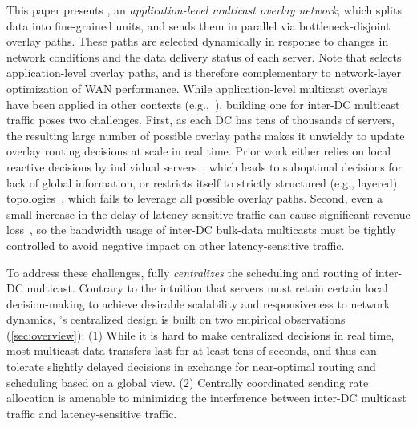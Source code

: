 This paper presents {\em \name}, an {\em application-level multicast
overlay network}, which splits data into fine-grained units, and
sends them in parallel via bottleneck-disjoint overlay paths. These
paths are selected dynamically in response to changes in network
conditions and the data delivery status of each server. Note that
\name selects application-level overlay paths, and is therefore
complementary to network-layer optimization of WAN performance.
While application-level multicast overlays have been applied in other
contexts (e.g.,~\cite{Liebeherr2002Application,Wang2007mTreebone,
Andreev2013Designing,Mokhtarian2015Minimum}), building one for
inter-DC multicast traffic poses two challenges. First, as each DC
has tens of thousands of servers, the resulting large number of
possible overlay paths makes it unwieldy to update overlay routing
decisions at scale in real time. Prior work either relies on local
reactive decisions by individual servers~\cite{kostic2003bullet,
Repantis2010Scaling,Huang2014A}, which leads to suboptimal decisions
for lack of global information, or restricts itself to strictly
structured (e.g., layered) topologies~\cite{Nygren2010The}, which
fails to leverage all possible overlay paths. Second, even a small
increase in the delay of latency-sensitive traffic can cause
significant revenue loss~\cite{zhang2017communication}, so the bandwidth usage of inter-DC
bulk-data multicasts must be tightly controlled to avoid negative
impact on other latency-sensitive traffic.

To address these challenges, \name fully {\em centralizes} the
scheduling and routing of inter-DC multicast. Contrary to the
intuition that servers must retain certain local decision-making to
achieve desirable scalability and responsiveness to network dynamics,
\name's centralized design is built on two empirical observations
(\Section\ref{sec:overview}):
(1) While it is hard to make centralized decisions in real time, most
multicast data transfers last for at least tens of seconds, and thus
can tolerate slightly delayed decisions in exchange for near-optimal
routing and scheduling based on a global view.
(2) Centrally coordinated sending rate allocation is amenable to
minimizing the interference between inter-DC multicast traffic and
latency-sensitive traffic.

